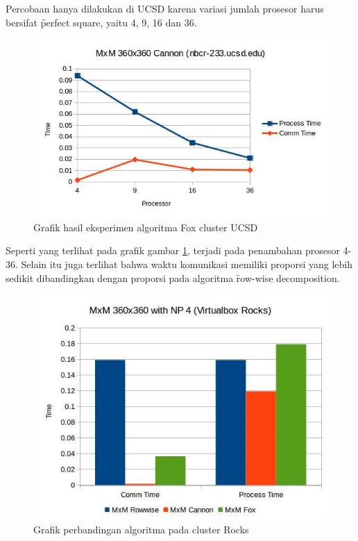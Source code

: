 Percobaan hanya dilakukan di \cluster UCSD karena variasi jumlah prosesor harus bersifat \f{perfect square}, yaitu 4, 9, 16 dan 36. 

\begin{figure}
	\centering
	\includegraphics[width=1\textwidth]
	{pics/chart_mm_cannon_nbcr}
	\caption{Grafik hasil eksperimen algoritma Fox cluster UCSD}
	\label{fig:result_mm_fox_nbcr}
\end{figure}  

Seperti yang terlihat pada grafik gambar \ref{fig:result_mm_fox_nbcr}, terjadi \speedup pada penambahan prosesor 4-36. Selain itu juga terlihat bahwa waktu komunikasi memiliki proporsi yang lebih sedikit dibandingkan dengan proporsi pada algoritma \f{row-wise decomposition}.

\begin{figure}
	\centering
	\includegraphics[width=1\textwidth]
	{pics/chart_mm_comparison_rocks}
	\caption{Grafik perbandingan algoritma pada cluster Rocks}
	\label{fig:result_mm_comparison_rocks}
\end{figure}  

